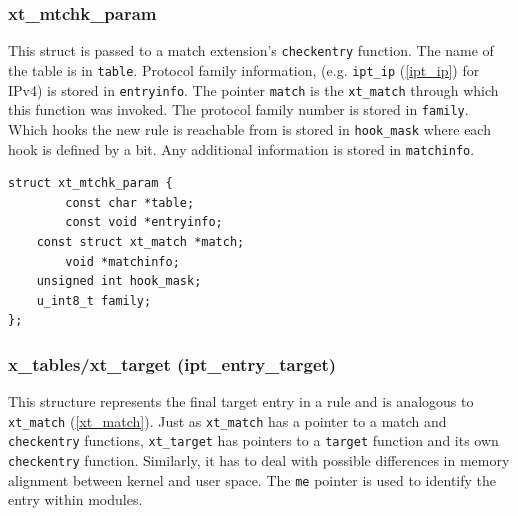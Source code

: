 \documentclass[a4paper,10pt]{article}
\newcommand{\code}[1]{\texttt{{#1}}}
\begin{document}
\subsubsection{xt\_mtchk\_param}\label{xt_mtchk_param}

This struct is passed to a match extension's \code{checkentry}
function. The name of the table is in \code{table}. Protocol family
information, (e.g. \code{ipt\_ip} (\ref{ipt_ip}) for IPv4) is stored
in \code{entryinfo}.  The pointer \code{match} is the \code{xt\_match}
through which this function was invoked. The protocol family number is
stored in \code{family}.  Which hooks the new rule is reachable from
is stored in \code{hook\_mask} where each hook is defined by a
bit. Any additional information is stored in \code{matchinfo}.

\begin{lstlisting}
struct xt_mtchk_param {
        const char *table;
        const void *entryinfo;
	const struct xt_match *match;
        void *matchinfo;
	unsigned int hook_mask;
	u_int8_t family;
};
\end{lstlisting}

\subsubsection{x\_tables/xt\_target (ipt\_entry\_target)}

This structure represents the final target entry in a rule and is
analogous to \code{xt\_match} (\ref{xt_match}). Just as
\code{xt\_match} has a pointer to a match and \verb|checkentry| functions,
\code{xt\_target} has pointers to a \code{target} function and its own
\code{checkentry} function. Similarly, it has to deal with possible
differences in memory alignment between kernel and user space. The
\code{me} pointer is used to identify the entry within modules.
\end{document}
